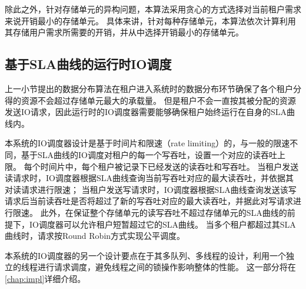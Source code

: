 除此之外，针对存储单元的异构问题，本算法采用贪心的方式选择对当前租户需求来说开销最小的存储单元。
具体来讲，针对每种存储单元，本算法依次计算利用其存储用户需求所需要的开销，并从中选择开销最小的存储单元。

\subsection{基于SLA曲线的运行时IO调度}

上一小节提出的数据分布算法在租户进入系统时的数据分布环节确保了各个租户分得的资源不会超过存储单元最大的承载量。
但是租户不会一直按其被分配的资源发送IO请求，因此运行时的IO调度器需要能够确保租户始终运行在自身的SLA曲线内。

本系统的IO调度器设计是基于时间片和限速（rate limiting）的，与一般的限速不同，基于SLA曲线的IO调度对租户的每一个写吞吐，设置一个对应的读吞吐上限。
每个时间片中，每个租户被记录下已经发送的读吞吐和写吞吐。
当租户发送读请求时，IO调度器根据SLA曲线查询当前写吞吐对应的最大读吞吐，并依据其对读请求进行限速；
当租户发送写请求时，IO调度器根据SLA曲线查询发送该写请求后当前读吞吐是否将超过了新的写吞吐对应的最大读吞吐，并据此对写请求进行限速。
此外，在保证整个存储单元的读写吞吐不超过存储单元的SLA曲线的前提下，IO调度器可以允许租户短暂超过它的SLA曲线。
当多个租户都超过其SLA曲线时，请求按Round Robin方式实现公平调度。

本系统的IO调度器的另一个设计要点在于其多队列、多线程的设计，利用一个独立的线程进行请求调度，避免线程之间的锁操作影响整体的性能。
这一部分将在\autoref{chap:impl}详细介绍。